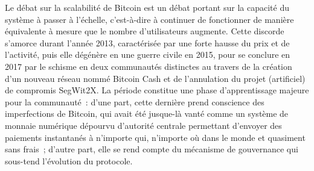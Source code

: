 Le débat sur la scalabilité de Bitcoin est un débat portant sur la capacité du système à passer à l'échelle, c'est-à-dire à continuer de fonctionner de manière équivalente à mesure que le nombre d'utilisateurs augmente. Cette discorde s'amorce durant l'année 2013, caractérisée par une forte hausse du prix et de l'activité, puis elle dégénère en une guerre civile en 2015, pour se conclure en 2017 par le schisme en deux communautés distinctes au travers de la création d'un nouveau réseau nommé Bitcoin Cash et de l'annulation du projet (artificiel) de compromis SegWit2X. La période constitue une phase d'apprentissage majeure pour la communauté~: d'une part, cette dernière prend conscience des imperfections de Bitcoin, qui avait été jusque-là vanté comme un système de monnaie numérique dépourvu d'autorité centrale permettant d'envoyer des paiements instantanés à n'importe qui, n'importe où dans le monde et quasiment sans frais~; d'autre part, elle se rend compte du mécanisme de gouvernance qui sous-tend l'évolution du protocole.

%

